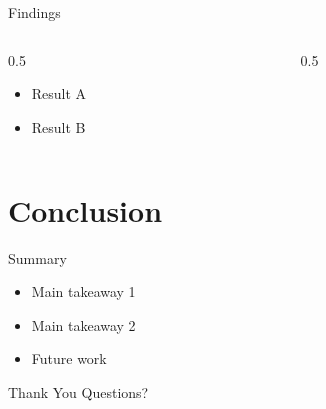\documentclass[aspectratio=169]{beamer}
\begin{document}
\begin{frame}{Findings}
  \begin{columns}[T]
    \begin{column}{0.5\textwidth}
      \begin{itemize}
        \item Result A
        \item Result B
      \end{itemize}
    \end{column}
    \begin{column}{0.5\textwidth}
    \end{column}
  \end{columns}
\end{frame}

\section{Conclusion}

\begin{frame}{Summary}
  \begin{itemize}
    \item Main takeaway 1
    \item Main takeaway 2
    \item Future work
  \end{itemize}
\end{frame}

\begin{frame}{Thank You}
  \centering
  \large Questions?
\end{frame}
\end{document}
